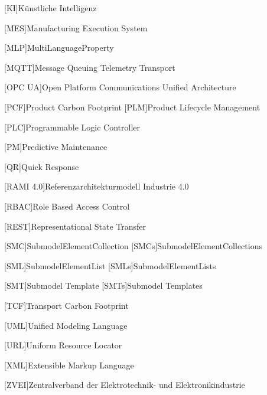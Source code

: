 {\begin{acronym}[RAMI 4.0]
[KI]{Künstliche Intelligenz}

[MES]{Manufacturing Execution System}

[MLP]{MultiLanguageProperty}

[MQTT]{Message Queuing Telemetry Transport}

[OPC UA]{Open Platform Communications Unified Architecture}

[PCF]{Product Carbon Footprint}
[PLM]{Product Lifecycle Management}

[PLC]{Programmable Logic Controller}

[PM]{Predictive Maintenance}

[QR]{Quick Response}

[RAMI 4.0]{Referenzarchitekturmodell Industrie 4.0}

[RBAC]{Role Based Access Control}

[REST]{Representational State Transfer}

[SMC]{SubmodelElementCollection}
[SMCs]{SubmodelElementCollections}

[SML]{SubmodelElementList}
[SMLs]{SubmodelElementLists}

[SMT]{Submodel Template}
[SMTs]{Submodel Templates}

[TCF]{Transport Carbon Footprint}

[UML]{Unified Modeling Language}

[URL]{Uniform Resource Locator}

[XML]{Extensible Markup Language}

[ZVEI]{Zentralverband der Elektrotechnik- und Elektronikindustrie}
\end{acronym}
}

\newpage